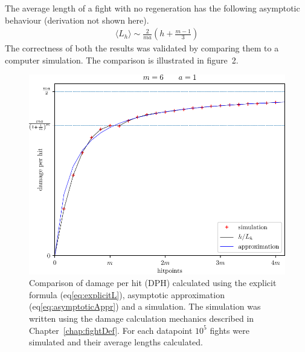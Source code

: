 The average length of a fight with no regeneration has the following asymptotic behaviour (derivation not shown here).
\begin{align}\label{eq:asymptoticAppr}
\langle L_h \rangle \sim \frac{2}{ma}\left(h + \frac{m-1}{3}\right)
\end{align}
The correctness of both the results was validated by comparing them to a computer simulation. The comparison is illustrated in figure~2.
\begin{figure}[t]\label{fig:apprComparison}
    \includegraphics[scale=1.1]{dph-appr-m6.pdf}
    \caption{Comparison of damage per hit (DPH) calculated using the explicit formula (eq\ref{eq:explicitL}), asymptotic approximation (eq\ref{eq:asymptoticAppr}) and a simulation. The simulation was written using the damage calculation mechanics described in Chapter~\ref{chap:fightDef}. For each datapoint $10^{5}$ fights were simulated and their average lengths calculated.}
\end{figure}

